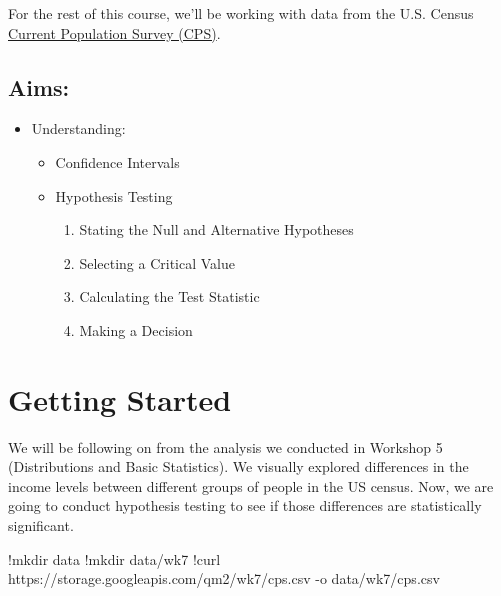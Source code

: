 \documentclass[
  letterpaper,
  DIV=11,
  numbers=noendperiod]{scrreprt}
\newenvironment{Shaded}{\begin{snugshade}}{\end{snugshade}}
\newcommand{\NormalTok}[1]{\textcolor[rgb]{0.00,0.23,0.31}{#1}}
\newcommand{\OperatorTok}[1]{\textcolor[rgb]{0.37,0.37,0.37}{#1}}
\providecommand{\tightlist}{%
  \setlength{\itemsep}{0pt}\setlength{\parskip}{0pt}}\usepackage{longtable,booktabs,array}
\begin{document}
For the rest of this course, we'll be working with data from the U.S.
Census \href{https://www.census.gov/programs-surveys/cps.html}{Current
Population Survey (CPS)}.

\hypertarget{aims-4}{%
\subsection{Aims:}\label{aims-4}}

\begin{itemize}
\tightlist
\item
  Understanding:

  \begin{itemize}
  \tightlist
  \item
    Confidence Intervals
  \item
    Hypothesis Testing

    \begin{enumerate}
    \def\labelenumi{\arabic{enumi}.}
    \tightlist
    \item
      Stating the Null and Alternative Hypotheses
    \item
      Selecting a Critical Value
    \item
      Calculating the Test Statistic
    \item
      Making a Decision
    \end{enumerate}
  \end{itemize}
\end{itemize}

\hypertarget{getting-started-2}{%
\section{Getting Started}\label{getting-started-2}}

We will be following on from the analysis we conducted in Workshop 5
(Distributions and Basic Statistics). We visually explored differences
in the income levels between different groups of people in the US
census. Now, we are going to conduct hypothesis testing to see if those
differences are statistically significant.

\begin{Shaded}
\begin{Highlighting}[]
\OperatorTok{!}\NormalTok{mkdir data}
\OperatorTok{!}\NormalTok{mkdir data}\OperatorTok{/}\NormalTok{wk7}
\OperatorTok{!}\NormalTok{curl https:}\OperatorTok{//}\NormalTok{storage.googleapis.com}\OperatorTok{/}\NormalTok{qm2}\OperatorTok{/}\NormalTok{wk7}\OperatorTok{/}\NormalTok{cps.csv }\OperatorTok{{-}}\NormalTok{o data}\OperatorTok{/}\NormalTok{wk7}\OperatorTok{/}\NormalTok{cps.csv}
\end{Highlighting}
\end{Shaded}
\end{document}
